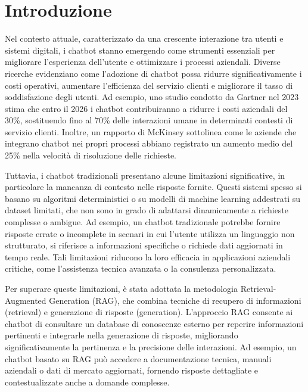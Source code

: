 \documentclass[a4paper,twoside,12pt]{toptesi}
\makeatletter
\def\cleardoublepage{\clearpage\if@twoside \ifodd\c@page\else
    \hbox{}
    \vspace*{\fill}
    \vspace{\fill}
    \thispagestyle{empty}
    \newpage
    \if@twocolumn\hbox{}\newpage\fi\fi\fi}
\makeatother
\begin{document}
\tableofcontents

\cleardoublepage

\setcounter{page}{1}

\chapter{Introduzione}
Nel contesto attuale, caratterizzato da una crescente interazione tra utenti e sistemi digitali, i chatbot stanno emergendo come strumenti essenziali per migliorare l’esperienza dell’utente e ottimizzare i processi aziendali. Diverse ricerche evidenziano come l’adozione di chatbot possa ridurre significativamente i costi operativi, aumentare l’efficienza del servizio clienti e migliorare il tasso di soddisfazione degli utenti. Ad esempio, uno studio condotto da Gartner nel 2023 stima che entro il 2026 i chatbot contribuiranno a ridurre i costi aziendali del 30\%, sostituendo fino al 70\% delle interazioni umane in determinati contesti di servizio clienti. Inoltre, un rapporto di McKinsey sottolinea come le aziende che integrano chatbot nei propri processi abbiano registrato un aumento medio del 25\% nella velocità di risoluzione delle richieste.

Tuttavia, i chatbot tradizionali presentano alcune limitazioni significative, in particolare la mancanza di contesto nelle risposte fornite. Questi sistemi spesso si basano su algoritmi deterministici o su modelli di machine learning addestrati su dataset limitati, che non sono in grado di adattarsi dinamicamente a richieste complesse o ambigue. Ad esempio, un chatbot tradizionale potrebbe fornire risposte errate o incomplete in scenari in cui l’utente utilizza un linguaggio non strutturato, si riferisce a informazioni specifiche o richiede dati aggiornati in tempo reale. Tali limitazioni riducono la loro efficacia in applicazioni aziendali critiche, come l’assistenza tecnica avanzata o la consulenza personalizzata.

Per superare queste limitazioni, è stata adottata la metodologia Retrieval-Augmented Generation (RAG), che combina tecniche di recupero di informazioni (retrieval) e generazione di risposte (generation). L’approccio RAG consente ai chatbot di consultare un database di conoscenze esterno per reperire informazioni pertinenti e integrarle nella generazione di risposte, migliorando significativamente la pertinenza e la precisione delle interazioni. Ad esempio, un chatbot basato su RAG può accedere a documentazione tecnica, manuali aziendali o dati di mercato aggiornati, fornendo risposte dettagliate e contestualizzate anche a domande complesse.
\end{document}
